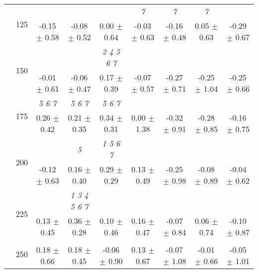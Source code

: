 \begin{table}[h]
{\begin{tabular}{
        ccccccccc}
 & \multirow{2}{*}{125}& \cellcolor[HTML]{EFEFEF} & \cellcolor[HTML]{EFEFEF} & \cellcolor[HTML]{EFEFEF} & \cellcolor[HTML]{EFEFEF} \textit{ 7 }& \cellcolor[HTML]{EFEFEF} \textit{ 7 }& \cellcolor[HTML]{EFEFEF} \textit{ 7 }& \cellcolor[HTML]{EFEFEF}  \\ 
 & & \cellcolor[HTML]{EFEFEF} -0.15 $\pm$ 0.58& \cellcolor[HTML]{EFEFEF} -0.08 $\pm$ 0.52& \cellcolor[HTML]{EFEFEF} 0.00 $\pm$ 0.64& \cellcolor[HTML]{EFEFEF} -0.03 $\pm$ 0.63& \cellcolor[HTML]{EFEFEF} -0.16 $\pm$ 0.48& \cellcolor[HTML]{EFEFEF} 0.05 $\pm$ 0.63& \cellcolor[HTML]{EFEFEF} -0.29 $\pm$ 0.67 \\ 
 & \multirow{2}{*}{150}& & & \textit{ 2 4 5 6 7 }& & & &  \\ 
 & & -0.01 $\pm$ 0.61& -0.06 $\pm$ 0.47& 0.17 $\pm$ 0.39& -0.07 $\pm$ 0.57& -0.27 $\pm$ 0.71& -0.25 $\pm$ 1.04& -0.25 $\pm$ 0.66 \\ 
 & \multirow{2}{*}{175}& \cellcolor[HTML]{EFEFEF} \textit{ 5 6 7 }& \cellcolor[HTML]{EFEFEF} \textit{ 5 6 7 }& \cellcolor[HTML]{EFEFEF} \textit{ 5 6 7 }& \cellcolor[HTML]{EFEFEF} & \cellcolor[HTML]{EFEFEF} & \cellcolor[HTML]{EFEFEF} & \cellcolor[HTML]{EFEFEF}  \\ 
 & & \cellcolor[HTML]{EFEFEF} 0.26 $\pm$ 0.42& \cellcolor[HTML]{EFEFEF} 0.21 $\pm$ 0.35& \cellcolor[HTML]{EFEFEF} 0.34 $\pm$ 0.31& \cellcolor[HTML]{EFEFEF} 0.00 $\pm$ 1.38& \cellcolor[HTML]{EFEFEF} -0.32 $\pm$ 0.91& \cellcolor[HTML]{EFEFEF} -0.28 $\pm$ 0.85& \cellcolor[HTML]{EFEFEF} -0.16 $\pm$ 0.75 \\ 
 & \multirow{2}{*}{200}& & \textit{ 5 }& \textit{ 1 5 6 7 }& & & &  \\ 
 & & -0.12 $\pm$ 0.63& 0.16 $\pm$ 0.40& 0.29 $\pm$ 0.29& 0.13 $\pm$ 0.49& -0.25 $\pm$ 0.98& -0.08 $\pm$ 0.89& -0.04 $\pm$ 0.62 \\ 
 & \multirow{2}{*}{225}& \cellcolor[HTML]{EFEFEF} & \cellcolor[HTML]{EFEFEF} \textit{ 1 3 4 5 6 7 }& \cellcolor[HTML]{EFEFEF} & \cellcolor[HTML]{EFEFEF} & \cellcolor[HTML]{EFEFEF} & \cellcolor[HTML]{EFEFEF} & \cellcolor[HTML]{EFEFEF}  \\ 
 & & \cellcolor[HTML]{EFEFEF} 0.13 $\pm$ 0.45& \cellcolor[HTML]{EFEFEF} 0.36 $\pm$ 0.28& \cellcolor[HTML]{EFEFEF} 0.10 $\pm$ 0.46& \cellcolor[HTML]{EFEFEF} 0.16 $\pm$ 0.47& \cellcolor[HTML]{EFEFEF} -0.07 $\pm$ 0.84& \cellcolor[HTML]{EFEFEF} 0.06 $\pm$ 0.74& \cellcolor[HTML]{EFEFEF} -0.10 $\pm$ 0.87 \\ 
 & \multirow{2}{*}{250}& & & & & & &  \\ 
 & & 0.18 $\pm$ 0.66& 0.18 $\pm$ 0.45& -0.06 $\pm$ 0.90& 0.13 $\pm$ 0.67& -0.07 $\pm$ 1.08& -0.01 $\pm$ 0.66& -0.05 $\pm$ 1.01 \\ 

\end{tabular}}
\end{table}
